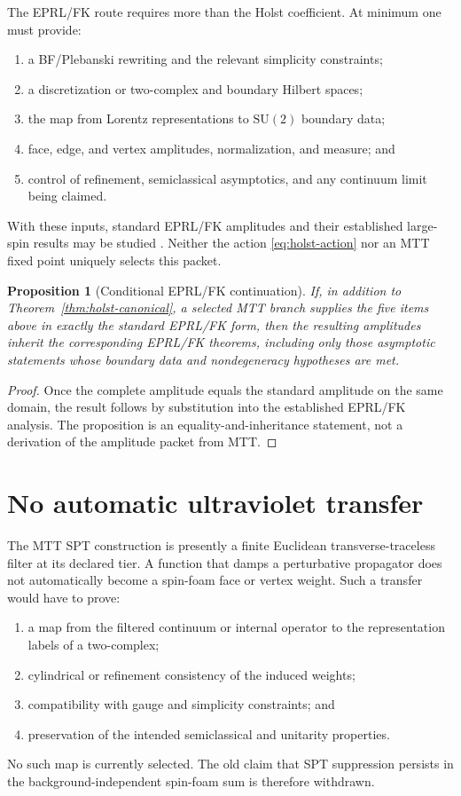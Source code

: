 \documentclass[11pt]{article}
\theoremstyle{plain}
\newtheorem{proposition}[theorem]{Proposition}
\newcommand{\SU}{\mathrm{SU}(2)}
\begin{document}
The EPRL/FK route requires more than the Holst coefficient. At minimum one
must provide:
\begin{enumerate}
\item a BF/Plebanski rewriting and the relevant simplicity constraints;
\item a discretization or two-complex and boundary Hilbert spaces;
\item the map from Lorentz representations to \(\SU\) boundary data;
\item face, edge, and vertex amplitudes, normalization, and measure; and
\item control of refinement, semiclassical asymptotics, and any continuum
  limit being claimed.
\end{enumerate}
With these inputs, standard EPRL/FK amplitudes and their established
large-spin results may be studied
\cite{Engle2008,FreidelKrasnov2007,Perez2013,Barrett2009}.
Neither the action \eqref{eq:holst-action} nor an MTT fixed point uniquely
selects this packet.

\begin{proposition}[Conditional EPRL/FK continuation]
If, in addition to Theorem~\ref{thm:holst-canonical}, a selected MTT branch
supplies the five items above in exactly the standard EPRL/FK form, then the
resulting amplitudes inherit the corresponding EPRL/FK theorems, including
only those asymptotic statements whose boundary data and nondegeneracy
hypotheses are met.
\end{proposition}

\begin{proof}
Once the complete amplitude equals the standard amplitude on the same domain,
the result follows by substitution into the established EPRL/FK analysis.
The proposition is an equality-and-inheritance statement, not a derivation of
the amplitude packet from MTT.
\end{proof}

\section{No automatic ultraviolet transfer}

The MTT SPT construction is presently a finite Euclidean
transverse-traceless filter at its declared tier. A function that damps a
perturbative propagator does not automatically become a spin-foam face or
vertex weight. Such a transfer would have to prove:
\begin{enumerate}
\item a map from the filtered continuum or internal operator to the
  representation labels of a two-complex;
\item cylindrical or refinement consistency of the induced weights;
\item compatibility with gauge and simplicity constraints; and
\item preservation of the intended semiclassical and unitarity properties.
\end{enumerate}
No such map is currently selected. The old claim that SPT suppression
persists in the background-independent spin-foam sum is therefore withdrawn.
\end{document}
